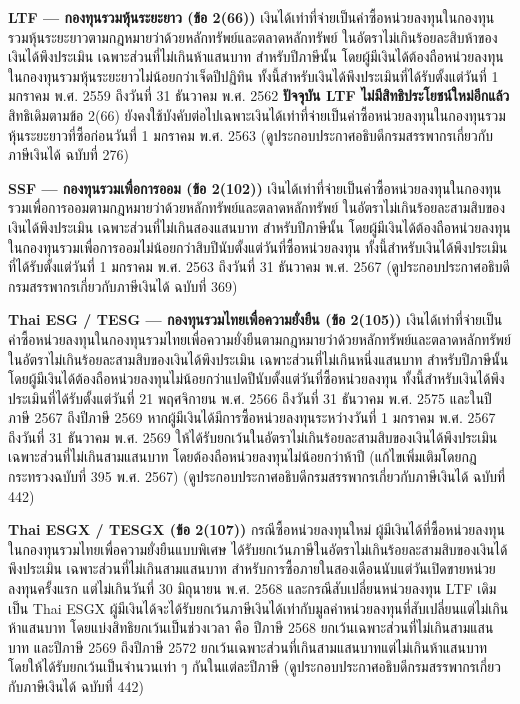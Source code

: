 \documentclass[12pt,a4paper]{article}
\newcommand{\hilight}[1]{\textbf{#1}}
\begin{document}
\textbf{LTF --- กองทุนรวมหุ้นระยะยาว (ข้อ 2(66))} เงินได้เท่าที่จ่ายเป็นค่าซื้อหน่วยลงทุนในกองทุนรวมหุ้นระยะยาวตามกฎหมายว่าด้วยหลักทรัพย์และตลาดหลักทรัพย์ ในอัตราไม่เกินร้อยละสิบห้าของเงินได้พึงประเมิน เฉพาะส่วนที่ไม่เกินห้าแสนบาท สำหรับปีภาษีนั้น โดยผู้มีเงินได้ต้องถือหน่วยลงทุนในกองทุนรวมหุ้นระยะยาวไม่น้อยกว่าเจ็ดปีปฏิทิน ทั้งนี้สำหรับเงินได้พึงประเมินที่ได้รับตั้งแต่วันที่ 1 มกราคม พ.ศ. 2559 ถึงวันที่ 31 ธันวาคม พ.ศ. 2562 \hilight{ปัจจุบัน LTF ไม่มีสิทธิประโยชน์ใหม่อีกแล้ว} สิทธิเดิมตามข้อ 2(66) ยังคงใช้บังคับต่อไปเฉพาะเงินได้เท่าที่จ่ายเป็นค่าซื้อหน่วยลงทุนในกองทุนรวมหุ้นระยะยาวที่ซื้อก่อนวันที่ 1 มกราคม พ.ศ. 2563 (ดูประกอบประกาศอธิบดีกรมสรรพากรเกี่ยวกับภาษีเงินได้ ฉบับที่ 276)

\textbf{SSF --- กองทุนรวมเพื่อการออม (ข้อ 2(102))} เงินได้เท่าที่จ่ายเป็นค่าซื้อหน่วยลงทุนในกองทุนรวมเพื่อการออมตามกฎหมายว่าด้วยหลักทรัพย์และตลาดหลักทรัพย์ ในอัตราไม่เกินร้อยละสามสิบของเงินได้พึงประเมิน เฉพาะส่วนที่ไม่เกินสองแสนบาท สำหรับปีภาษีนั้น โดยผู้มีเงินได้ต้องถือหน่วยลงทุนในกองทุนรวมเพื่อการออมไม่น้อยกว่าสิบปีนับตั้งแต่วันที่ซื้อหน่วยลงทุน ทั้งนี้สำหรับเงินได้พึงประเมินที่ได้รับตั้งแต่วันที่ 1 มกราคม พ.ศ. 2563 ถึงวันที่ 31 ธันวาคม พ.ศ. 2567 (ดูประกอบประกาศอธิบดีกรมสรรพากรเกี่ยวกับภาษีเงินได้ ฉบับที่ 369)

\textbf{Thai ESG / TESG --- กองทุนรวมไทยเพื่อความยั่งยืน (ข้อ 2(105))} เงินได้เท่าที่จ่ายเป็นค่าซื้อหน่วยลงทุนในกองทุนรวมไทยเพื่อความยั่งยืนตามกฎหมายว่าด้วยหลักทรัพย์และตลาดหลักทรัพย์ ในอัตราไม่เกินร้อยละสามสิบของเงินได้พึงประเมิน เฉพาะส่วนที่ไม่เกินหนึ่งแสนบาท สำหรับปีภาษีนั้น โดยผู้มีเงินได้ต้องถือหน่วยลงทุนไม่น้อยกว่าแปดปีนับตั้งแต่วันที่ซื้อหน่วยลงทุน ทั้งนี้สำหรับเงินได้พึงประเมินที่ได้รับตั้งแต่วันที่ 21 พฤศจิกายน พ.ศ. 2566 ถึงวันที่ 31 ธันวาคม พ.ศ. 2575 และในปีภาษี 2567 ถึงปีภาษี 2569 หากผู้มีเงินได้มีการซื้อหน่วยลงทุนระหว่างวันที่ 1 มกราคม พ.ศ. 2567 ถึงวันที่ 31 ธันวาคม พ.ศ. 2569 ให้ได้รับยกเว้นในอัตราไม่เกินร้อยละสามสิบของเงินได้พึงประเมิน เฉพาะส่วนที่ไม่เกินสามแสนบาท โดยต้องถือหน่วยลงทุนไม่น้อยกว่าห้าปี (แก้ไขเพิ่มเติมโดยกฎกระทรวงฉบับที่ 395 พ.ศ. 2567) (ดูประกอบประกาศอธิบดีกรมสรรพากรเกี่ยวกับภาษีเงินได้ ฉบับที่ 442)

\textbf{Thai ESGX / TESGX (ข้อ 2(107))} กรณีซื้อหน่วยลงทุนใหม่ ผู้มีเงินได้ที่ซื้อหน่วยลงทุนในกองทุนรวมไทยเพื่อความยั่งยืนแบบพิเศษ ได้รับยกเว้นภาษีในอัตราไม่เกินร้อยละสามสิบของเงินได้พึงประเมิน เฉพาะส่วนที่ไม่เกินสามแสนบาท สำหรับการซื้อภายในสองเดือนนับแต่วันเปิดขายหน่วยลงทุนครั้งแรก แต่ไม่เกินวันที่ 30 มิถุนายน พ.ศ. 2568 และกรณีสับเปลี่ยนหน่วยลงทุน LTF เดิมเป็น Thai ESGX ผู้มีเงินได้จะได้รับยกเว้นภาษีเงินได้เท่ากับมูลค่าหน่วยลงทุนที่สับเปลี่ยนแต่ไม่เกินห้าแสนบาท โดยแบ่งสิทธิยกเว้นเป็นช่วงเวลา คือ ปีภาษี 2568 ยกเว้นเฉพาะส่วนที่ไม่เกินสามแสนบาท และปีภาษี 2569 ถึงปีภาษี 2572 ยกเว้นเฉพาะส่วนที่เกินสามแสนบาทแต่ไม่เกินห้าแสนบาท โดยให้ได้รับยกเว้นเป็นจำนวนเท่า ๆ กันในแต่ละปีภาษี (ดูประกอบประกาศอธิบดีกรมสรรพากรเกี่ยวกับภาษีเงินได้ ฉบับที่ 442)
\end{document}
